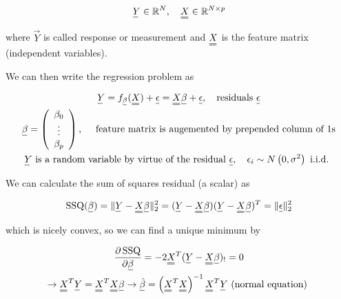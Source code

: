 \begin{equation}
    \vec{Y} \in \mathbb{R}^N, \quad \mat{X} \in \mathbb{R}^{N\times p}
\end{equation}

where $\vec{Y}$ is called response or measurement and $\mat{X}$ is the feature matrix (independent variables).

We can then write the regression problem as

\begin{equation}
    \begin{gathered}
        \vec{Y} = f_\vec{\beta}(\mat{X}) + \vec{\epsilon} = \mat{X}\vec{\beta} + \vec{\epsilon}, \quad \text{residuals } \vec{\epsilon} \\
        \vec{\beta}=\left(\begin{array}{c}
            \beta_0 \\
            \vdots \\
            \beta_p
            \end{array}\right), \quad \text { feature matrix is augemented by prepended column of } 1 \text{s} \\
            \vec{Y} \text { is a random variable by virtue of the residual } \vec{\epsilon}, \quad \epsilon_i \sim N\left(0, \sigma^2\right) \text { i.i.d. }
    \end{gathered}
\end{equation}

We can calculate the sum of squares residual (a scalar) as

\begin{equation}
    \operatorname{SSQ}(\vec{\beta})=\|\vec{Y}-\mat{X} \vec{\beta}\|_2^2=(\vec{Y}-\mat{X} \vec{\beta})(\vec{Y}-\mat{X} \vec{\beta})^T=\|\vec{\epsilon}\|_2^2
\end{equation}

which is nicely convex, so we can find a unique minimum by

\begin{equation}
    \begin{gathered}
    \frac{\partial \operatorname{SSQ}}{\partial \vec{\beta}}=-2 \mat{X}^T(\vec{Y}-\mat{X} \vec{\beta})_{!}=0 \\
    \rightarrow \mat{X}^T \vec{Y}=\mat{X}^T \mat{X} \vec{\beta} \rightarrow \vec{\hat{\beta}}=\left(\mat{X}^T \mat{X}\right)^{-1} \mat{X}^T \vec{Y} \text { (normal equation) }
    \end{gathered}
\end{equation}

